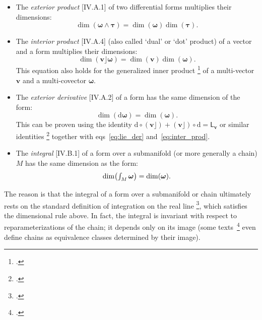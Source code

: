\documentclass[\ifafour a4paper,12pt,\else a5paper,10pt,\fi%
onecolumn,oneside,article,%
british%
]{memoir}
\newcommand*{\defquote}[1]{`#1'}
\theoremstyle{remark}
\theoremstyle{innote}
\newcommand*{\citep}{\footcites}
\newcommand*{\di}{\mathrm{d}}%
\renewcommand*{\|}[1][]{\nonscript\,#1\vert\nonscript\;\mathopen{}}
\newcommand*{\sect}{\S}%
\newcommand*{\sects}{\S\S}%
\newcommand*{\chap}{ch.}%
\newcommand*{\eqns}{eqs}%
\newcommand*{\eg}{{e.g.}}
\newcommand*{\tint}{\begingroup\textstyle\int\endgroup\nolimits}
\newcommand*{\Li}{\textsf{L}}
\newcommand*{\ii}{\mathbin{\!\rfloor\!}}
\newcommand*{\yom}{\bm{\omega}}
\newcommand*{\yta}{\bm{\tau}}
\newcommand*{\yv}{\bm{v}}
\begin{document}
\begin{itemize}[wide=0pt]
\item The \emph{exterior product} [IV.A.1] of two differential forms
  multiplies their dimensions:
  \begin{equation}
  \dim(\yom\land\yta) = \dim(\yom)\dim(\yta).\label{eq:ext_prod}
\end{equation}
  
\item The \emph{interior product} [IV.A.4] (also called \defquote{dual} or
  \defquote{dot} product) of a vector and a form multiplies their
  dimensions:
  \begin{equation}
    \dim(\yv\ii\yom) =\dim(\yv)\dim(\yom).
    \label{eq:inter_prod}
\end{equation}
This equation also holds for the generalized inner product
\citep{deschamps1970}[Appendices]{deschamps1981}{lindell2004}[\sect~F.I.267]{truesdelletal1960}[Box
4.1, p. 92, item 4]{misneretal1970_r1973}[see also][]{portamana2019e} of a
multi-vector $\yv$ and a multi-covector $\yom$.


\item The \emph{exterior derivative} [IV.A.2] of a form has the same
  dimension of the form:
  \begin{equation}
    \dim(\di\yom) =\dim(\yom).
    \label{eq:ext_deriv}
  \end{equation}
  This can be proven using the identity
  $\di\circ(\yv\ii)+(\yv\ii)\circ\di = \Li_{\yv}$ or similar identities
  \citep[\chap~9 p.~180 Theorem~9.78]{curtisetal1985}[\sect~6.4
  Theorem~6.4.8]{abrahametal1983_r1988} together with
  \eqns~\eqref{eq:lie_der} and~\eqref{eq:inter_prod}.

\item The \emph{integral} [IV.B.1] of a form over a submanifold (or more
  generally a chain) $M$ has the same dimension as the form:
  \begin{equation}
    \dim\bigl(\tint_{M}\yom\bigr) =\dim(\yom).
    \label{eq:integration}
  \end{equation}
\end{itemize}
The reason is that the integral of a form over a submanifold or chain
ultimately rests on the standard definition of integration on the real line
\citep[\eg][\sects~IV.B.1--2]{choquetbruhatetal1977_r1996}[\sect~5 p.~21,
\sect~6
p.~24]{derham1955_t1984}[\sect~7.1]{abrahametal1983_r1988}[\sect~VI.2]{boothby1975_r2003},
which satisfies the dimensional rule above. In fact, the integral is
invariant with respect to reparameterizations of the chain; it depends only
on its image (some texts~\citep[\eg][\sect~10.4
p.~297]{martin1991_r2004}[\sect~7.3]{fecko2006} even define chains as
equivalence classes determined by their image).
\end{document}
